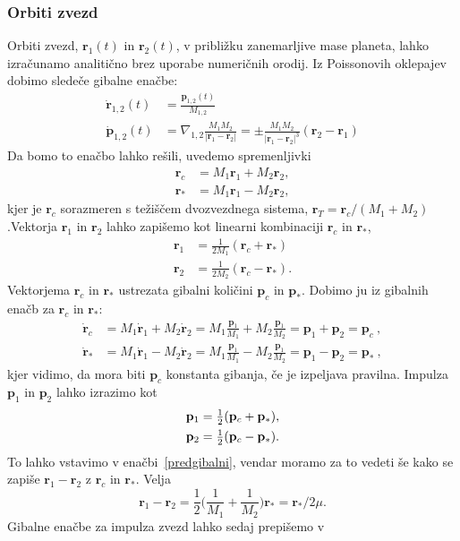 \documentclass[12pt, a4paper]{article}
\renewcommand{\r}{
    \ensuremath{\mathbf{r}}
}
\newcommand{\p}{
    \ensuremath{\mathbf{p}}
}
\newcommand{\sfrac}[2]{
    \ensuremath{\textstyle{\frac{#1}{#2}}}
}
\begin{document}
\subsubsection{Orbiti zvezd}
Orbiti zvezd, $\r_1(t)$ in $\r_2(t)$, v pribli\v zku zanemarljive mase planeta, lahko izra\v cunamo analiti\v cno brez
uporabe numeri\v cnih orodij. Iz Poissonovih oklepajev dobimo slede\v ce gibalne ena\v cbe:
\begin{align}
    \dot{\r}_{1,2}(t) &= \frac{\p_{1,2}(t)}{M_{1,2}} \\
    \dot{\p}_{1,2}(t) &= \nabla_{1,2} \frac{M_1 M_2}{|\r_1 - \r_2|} = \pm \frac{M_1 M_2}{|\r_1 - \r_2|^3}(\r_2 - \r_1)
    \label{predgibalni}
\end{align}
Da bomo to ena\v cbo lahko re\v sili, uvedemo spremenljivki
\begin{align*}
    \r_c &= M_1\r_1 + M_2\r_2, \\
    \r_* &= M_1\r_1 - M_2\r_2,
\end{align*}
kjer je $\r_c$ sorazmeren s te\v zi\v s\v cem dvozvezdnega sistema, $\r_T = \r_c/(M_1 + M_2)$.Vektorja $\r_1$ in $\r_2$
lahko zapi\v semo kot linearni kombinaciji $\r_c$ in $\r_*$,
\begin{align*}
    \r_1 &= \sfrac{1}{2M_1}(\r_c + \r_*) \\
    \r_2 &= \sfrac{1}{2M_2}(\r_c - \r_*).
\end{align*}
Vektorjema $\r_c$ in $\r_*$ ustrezata gibalni koli\v cini $\p_c$ in $\p_*$. Dobimo ju iz gibalnih ena\v cb za $\r_c$
in $\r_*$:
\begin{align}
    \dot{\r}_c &= M_1\dot{\r}_1 + M_2\dot{\r}_2 = M_1\sfrac{\p_1}{M_1} + M_2\sfrac{\p_1}{M_2} = \p_1 + \p_2 = \p_c\ , \\
    \dot{\r}_* &= M_1\dot{\r}_1 - M_2\dot{\r}_2 = M_1\sfrac{\p_1}{M_1} - M_2\sfrac{\p_1}{M_2} = \p_1 - \p_2 = \p_*\ ,
\end{align}
kjer vidimo, da mora biti $\p_c$ konstanta gibanja, \v ce je izpeljava pravilna. Impulza $\p_1$ in $\p_2$ lahko
izrazimo kot
\begin{align}
    \p_1 &= \sfrac{1}{2}(\p_c + \p_*), \notag \\
    \p_2 &= \sfrac{1}{2}(\p_c - \p_*).
\end{align}
To lahko vstavimo v ena\v cbi~\eqref{predgibalni}, vendar moramo za to vedeti \v se kako se zapi\v se $\r_1 - \r_2$
z $\r_c$ in $\r_*$. Velja
\[
    \r_1 - \r_2 = \sfrac{1}{2}\big(\sfrac{1}{M_1} + \sfrac{1}{M_2}\big)\r_* = \r_*/2\mu.
\]
Gibalne ena\v cbe za impulza zvezd lahko sedaj prepi\v semo v
\end{document}
